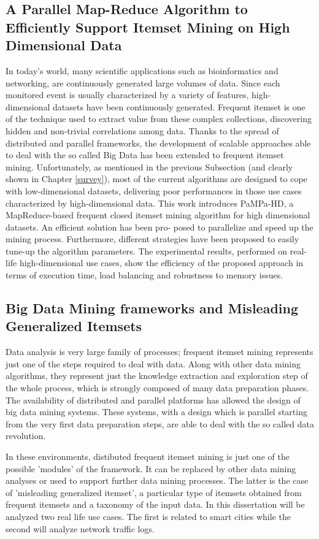 \subsection{A Parallel Map-Reduce Algorithm to Efficiently
Support Itemset Mining on High Dimensional Data}
In today's world, many scientific applications such as bioinformatics and networking, are continuously generated large volumes of data. Since
each monitored event is usually characterized by a variety of features, high-dimensional datasets have been continuously generated. 
Frequent itemset is one of the technique used to extract value from these complex collections, discovering hidden and non-trivial correlations among data. 
Thanks to the spread of distributed and parallel frameworks, the development of scalable approaches able to deal with the so called Big Data has been extended
to frequent itemset mining. Unfortunately, as mentioned in the previous Subsection (and clearly shown in Chapter \ref{survey}), most of the current algorithms are designed to cope with low-dimensional datasets, delivering poor performances in those use cases characterized by high-dimensional data. This work introduces 
PaMPa-HD, a MapReduce-based frequent closed itemset mining
algorithm for high dimensional datasets. An efficient solution has been pro-
posed to parallelize and speed up the mining process. Furthermore, different
strategies have been proposed to easily tune-up the algorithm parameters.
The experimental results, performed on real-life high-dimensional use cases,
show the efficiency of the proposed approach in terms of execution time, load
balancing and robustness to memory issues.

\subsection{Big Data Mining frameworks and Misleading Generalized Itemsets}
Data analysis is very large family of processes; frequent itemset mining represents just one of the steps required to deal with data. Along with other data mining algorithms, they represent just the knowledge extraction and exploration step of the whole process, which is strongly composed of many data preparation phases.
The availability of distributed and parallel platforms has allowed the design of big data mining systems. These systems, with a design which is parallel starting from the very first data preparation steps, are able to deal with the so called data revolution.

In these environments, distibuted frequent itemset mining is just one of the possible 'modules' of the framework. It can be replaced by other data mining analyses or used to support further data mining processes. The latter is the case of 'misleading generalized itemset', a particular type of itemsets obtained from frequent itemsets and a taxonomy of the input data. In this dissertation will be analyzed two real life use cases. The first is related to smart cities while the second will analyze network traffic logs.
